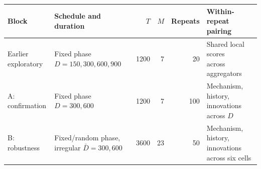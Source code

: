\begin{tabular}{llrrrl}
\toprule
Block & Schedule and duration & $T$ & $M$ & Repeats & Within-repeat pairing \\
\midrule
\shortstack[l]{Earlier\\exploratory} & \shortstack[l]{Fixed phase\\$D=150,300,600,900$} & 1200 & 7 & 20 & \shortstack[l]{Shared local scores\\across aggregators} \\
A: confirmation & \shortstack[l]{Fixed phase\\$D=300,600$} & 1200 & 7 & 100 & \shortstack[l]{Mechanism, history,\\innovations across $D$} \\
B: robustness & \shortstack[l]{Fixed/random phase, irregular\\$\bar D=300,600$} & 3600 & 23 & 50 & \shortstack[l]{Mechanism, history,\\innovations across six cells} \\
\bottomrule
\end{tabular}
